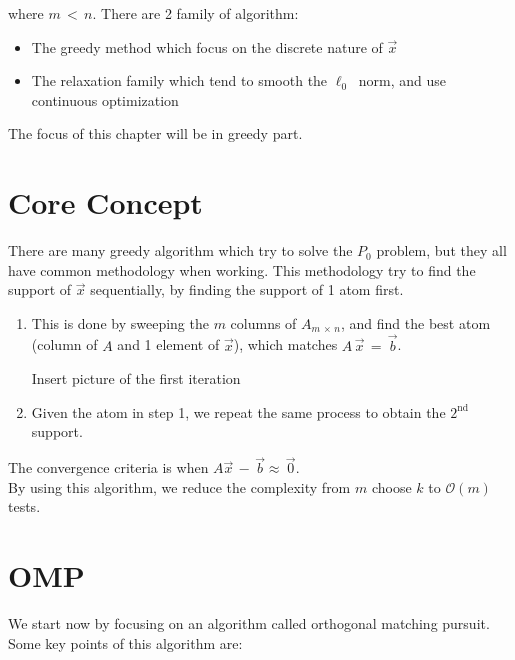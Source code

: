 \documentclass[12pt,a4paper]{book}
\begin{document}
where $m \, < \, n$. There are 2 family of algorithm:

\begin{itemize}
    \item The greedy method which focus on the discrete nature of $\Vec{x}$
    
    \item The relaxation family which tend to smooth the $\ell_0 ~$ norm, and use continuous optimization
    
\end{itemize}

The focus of this chapter will be in greedy part.

\section{Core Concept}

There are many greedy algorithm which try to solve the $P_0$ problem, but they all have common methodology when working. This methodology try to find the support of $\Vec{x}$ sequentially, by finding the support of 1 atom first.\\


\begin{enumerate}

\item This is done by sweeping the $m$ columns of $A_{m \, \times \, n}$, and find the best atom (column of $A$ and 1 element of $\Vec{x}$), which matches $A \, \Vec{x} \, = \, \Vec{b}$.

 Insert picture of the first iteration

\item Given the atom in step 1, we repeat the same process to obtain the $\mathrm{2}^\mathrm{nd}$ support.

\end{enumerate}

The convergence criteria is when $A \Vec{x} \, - \, \Vec{b} \approx  \, \Vec{0} $.\\

By using this algorithm, we reduce the complexity from $m$ choose $k$ to $\mathcal{O}(m)$ tests.

\section{OMP}

We start now by focusing on an algorithm called orthogonal matching pursuit. Some key points of this algorithm are:
\end{document}
